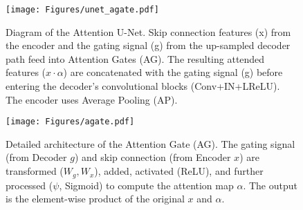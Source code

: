 \documentclass[
	letterpaper, %
]{jdf}
\begin{document}
\begin{figure}[htbp] %
    \centering %
    \texttt{[image: Figures/unet\_agate.pdf]}
    \caption{Diagram of the Attention U-Net. Skip connection features (x) from the encoder and the gating signal (g) from the up-sampled decoder path feed into Attention Gates (AG). The resulting attended features ($x \cdot \alpha$) are concatenated with the gating signal (g) before entering the decoder's convolutional blocks (Conv+IN+LReLU). The encoder uses Average Pooling (AP).}
    \label{fig:unet-agate}
\end{figure}

\begin{figure}[htbp] %
    \centering %
    \texttt{[image: Figures/agate.pdf]}
    \caption{Detailed architecture of the Attention Gate (AG). The gating signal (from Decoder $g$) and skip connection (from Encoder $x$) are transformed ($W_g, W_x$), added, activated (ReLU), and further processed ($\psi$, Sigmoid) to compute the attention map $\alpha$. The output is the element-wise product of the original $x$ and $\alpha$.}
    \label{fig:agate}
\end{figure}
\end{document}
